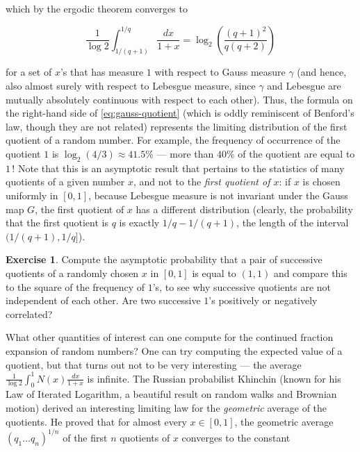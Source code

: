\documentclass[11pt]{report}
\theoremstyle{plain}
\theoremstyle{definition}
\newtheorem{xexercise}[thm]{Exercise}
\begin{document}
\begin{enumerate}[label=\arabic*.]
\noindent which by the ergodic theorem converges to

\begin{equation*} \tag{21}\label{eq:gauss-quotient}
\frac{1}{\log 2}\int_{1/(q+1)}^{1/q} \frac{dx}{1+x} = \log_2 \left( \frac{(q+1)^2}{q(q+2)}\right)
\end{equation*}

\noindent for a set of $x$'s that has measure $1$ with respect
to Gauss measure $\gamma$ (and hence, also almost
surely with respect to Lebesgue measure, since
$\gamma$ and Lebesgue are mutually absolutely
continuous with respect to each other). Thus, the
formula on the right-hand side of
\eqref{eq:gauss-quotient} (which is oddly reminiscent of
Benford's law, though they are not related) represents
the limiting distribution of the first quotient of a
random number. For example, the frequency of
occurrence of the quotient $1$ is
$\log_2(4/3) \approx 41.5\%$ --- more than $40\%$ of
the quotient are equal to $1$\,! Note that this is an
asymptotic result that pertains to the statistics of
many quotients of a given number $x$, and not to the
\emph{first quotient of $x$}: if $x$ is chosen uniformly
in $[0,1]$, because Lebesgue measure is not invariant
under the Gauss map $G$, the first quotient of $x$
has a different distribution (clearly, the probability
that the first quotient is $q$ is exactly
$1/q-1/(q+1)$, the length of the interval
$(1/(q+1),1/q]$).

\begin{xexercise}
Compute the asymptotic probability that a pair of
successive quotients of a randomly chosen $x$ in
$[0,1]$ is equal to $(1,1)$ and compare this to the
square of the frequency of $1$'s, to see why
successive quotients are not independent of each
other. Are two successive $1$'s positively or
negatively correlated?
\end{xexercise}

\noindent What other quantities of interest can one compute for
the continued fraction expansion of random numbers?
One can try computing the expected value of a
quotient, but that turns out not to be very
interesting --- the average
$\frac{1}{\log 2} \int_0^1 N(x) \frac{dx}{1+x}$ is
infinite. The Russian probabilist Khinchin (known for
his Law of Iterated Logarithm, a beautiful result on
random walks and Brownian motion) derived an
interesting limiting law for the \emph{geometric} average
of the quotients. He proved that for almost every
$x\in[0,1]$, the geometric average
$(q_1\ldots q_n)^{1/n}$ of the first $n$ quotients of
$x$ converges to the constant


\end{enumerate}
\end{document}

